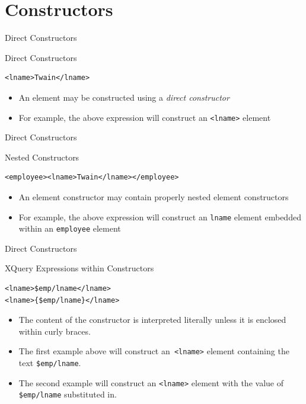 \documentclass[svgnames]{beamer}
\begin{document}
\section{Constructors}

\begin{frame}[fragile]{Direct Constructors}
\small
\begin{block}{Direct Constructors}
\begin{verbatim}
<lname>Twain</lname>
\end{verbatim}
\end{block}
\normalsize
\begin{itemize}
	\item An element may be constructed using a \emph{direct constructor}
	\item For example, the above expression will construct an \texttt{<lname>} element
\end{itemize}
\end{frame}

\begin{frame}[fragile]{Direct Constructors}
\small
\begin{block}{Nested Constructors}
\begin{verbatim}
<employee><lname>Twain</lname></employee>
\end{verbatim}
\end{block}
\normalsize
\begin{itemize}
	\item An element constructor may contain properly nested element constructors
	\item For example, the above expression will construct an \texttt{lname} element embedded within an \texttt{employee} element
\end{itemize}
\end{frame}

\begin{frame}[fragile]{Direct Constructors}
\small
\begin{block}{XQuery Expressions within Constructors}
\begin{verbatim}
<lname>$emp/lname</lname>
<lname>{$emp/lname}</lname>
\end{verbatim}
\end{block}
\normalsize
\begin{itemize}
	\item The content of the constructor is interpreted literally unless it is enclosed within curly braces.
	\item The first example above will construct an\texttt{ <lname>} element containing the text \texttt{\$emp/lname}.
	\item The second example will construct an \texttt{<lname>} element with the value of \texttt{\$emp/lname} substituted in.
\end{itemize}
\end{frame}
\end{document}
